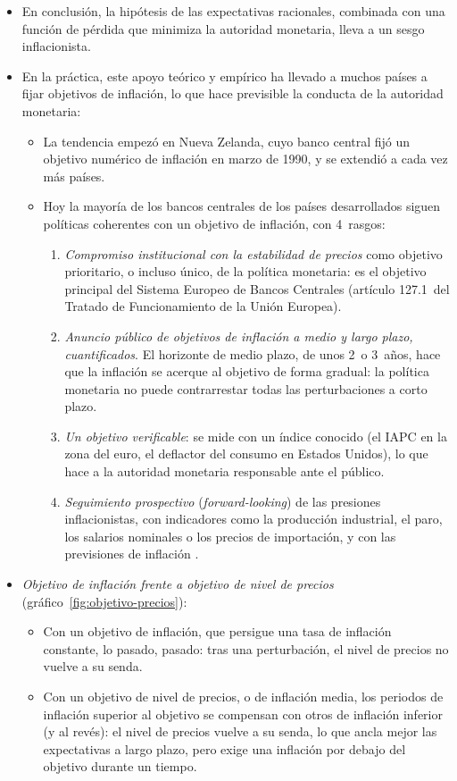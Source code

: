 \documentclass[11pt]{article}
\begin{document}
\begin{itemize}
\item En conclusión, la hipótesis de las expectativas racionales, combinada con una función de pérdida que minimiza la autoridad monetaria, lleva a un sesgo inflacionista.
\item En la práctica, este apoyo teórico y empírico ha llevado a muchos países a fijar objetivos de inflación, lo que hace previsible la conducta de la autoridad monetaria:
  \begin{itemize}
  \item La tendencia empezó en Nueva Zelanda, cuyo banco central fijó un objetivo numérico de inflación en marzo de 1990\nocite{BernankeEtAl1997NuevaZelanda}, y se extendió a cada vez más países.
  \item Hoy la mayoría de los bancos centrales de los países desarrollados siguen políticas coherentes con un objetivo de inflación, con 4~rasgos:
    \begin{enumerate}[label=\roman*)]
    \item \emph{Compromiso institucional con la estabilidad de precios} como objetivo prioritario, o incluso único, de la política monetaria: es el objetivo principal del Sistema Europeo de Bancos Centrales (artículo 127.1~del Tratado de Funcionamiento de la Unión Europea).
    \item \emph{Anuncio público de objetivos de inflación a medio y largo plazo, cuantificados}. El horizonte de medio plazo, de unos 2~o 3~años, hace que la inflación se acerque al objetivo de forma gradual: la política monetaria no puede contrarrestar todas las perturbaciones a corto plazo.
    \item \emph{Un objetivo verificable}: se mide con un índice conocido (el IAPC en la zona del euro, el deflactor del consumo en Estados Unidos), lo que hace a la autoridad monetaria responsable ante el público.
    \item \emph{Seguimiento prospectivo} (\emph{forward-looking}) de las presiones inflacionistas, con indicadores como la producción industrial, el paro, los salarios nominales o los precios de importación, y con las previsiones de inflación .
    \end{enumerate}
  \end{itemize}
\item \emph{Objetivo de inflación frente a objetivo de nivel de precios} (gráfico~\ref{fig:objetivo-precios}):
  \begin{itemize}
  \item Con un objetivo de inflación, que persigue una tasa de inflación constante, lo pasado, pasado: tras una perturbación, el nivel de precios no vuelve a su senda.
  \item Con un objetivo de nivel de precios, o de inflación media, los periodos de inflación superior al objetivo se compensan con otros de inflación inferior (y al revés): el nivel de precios vuelve a su senda, lo que ancla mejor las expectativas a largo plazo, pero exige una inflación por debajo del objetivo durante un tiempo\nocite{MinfordHatcher2014}.
  \end{itemize}
\end{itemize}
\end{document}
